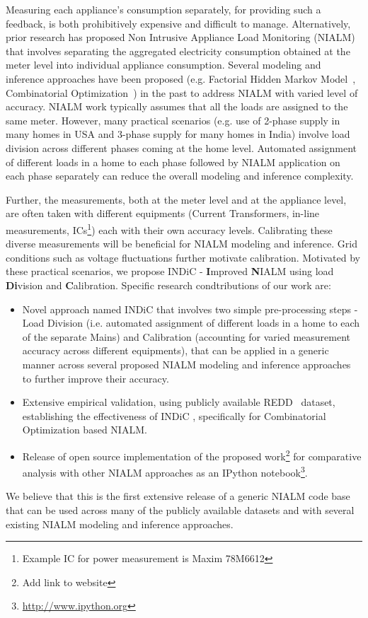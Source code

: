 \documentclass[conference]{IEEEtran}
\newcommand{\indic}{INDiC }
\newcommand{\indicns}{INDiC }
\begin{document}
\noindent Measuring each appliance's consumption separately, for providing such a feedback, is both prohibitively expensive and difficult to manage. Alternatively, prior research has proposed Non Intrusive Appliance Load Monitoring (NIALM) that involves separating the aggregated electricity consumption obtained at the meter level into individual appliance consumption. Several modeling and inference approaches have been proposed (e.g. Factorial Hidden Markov Model~\cite{Ghahramani_97a}, Combinatorial Optimization~\cite{hart}) in the past to address NIALM with varied level of accuracy. NIALM work typically assumes that all the loads are assigned to the same meter. However, many practical scenarios (e.g. use of 2-phase supply in many homes in USA and 3-phase supply for many homes in India) involve load division across different phases coming at the home level. Automated assignment of different loads in a home to each phase followed by NIALM application on each phase separately can reduce the overall modeling and inference complexity. 

\noindent Further, the measurements, both at the meter level and at the appliance level, are often taken with different equipments (Current Transformers, in-line measurements, ICs\footnote{Example IC for power measurement is Maxim 78M6612}) each with their own accuracy levels. Calibrating these diverse measurements will be beneficial for NIALM modeling and inference. Grid conditions such as voltage fluctuations further motivate calibration. Motivated by these practical scenarios, we propose \indic - \textbf{I}mproved \textbf{N}IALM using load \textbf{Di}vision and \textbf{C}alibration. Specific research condtributions of our work are:
\begin{itemize}
\item Novel approach named \indic that involves two simple pre-processing steps - Load Division (i.e. automated assignment of different loads in a home to each of the separate Mains) and Calibration (accounting for varied measurement accuracy across different equipments), that can be applied in a generic manner across several proposed NIALM modeling and inference approaches to further improve their accuracy. 
\item Extensive empirical validation, using publicly available REDD~\cite{redd} dataset, establishing the effectiveness of \indicns, specifically for Combinatorial Optimization based NIALM. 
\item Release of open source implementation of the proposed work\footnote{Add link to website} for comparative analysis with other NIALM approaches as an IPython notebook\footnote{\url{http://www.ipython.org}}. 
\end{itemize}
\noindent We believe that this is the first extensive release of a generic NIALM code base that can be used across many of the publicly available datasets and with several existing NIALM modeling and inference approaches.
\end{document}
